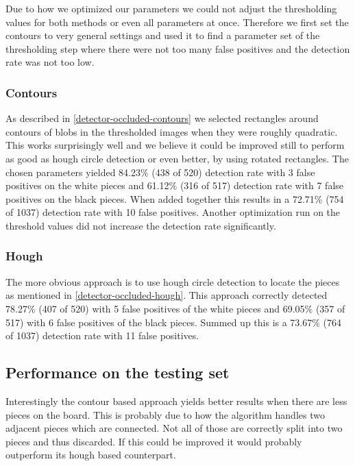 	Due to how we optimized our parameters we could not adjust the thresholding values for both methods or even all parameters at once. Therefore we first set the contours to very general settings and used it to find a parameter set of the thresholding step where there were not too many false positives and the detection rate was not too low.

	\subsubsection{Contours}
	\label{evaluation-occluded-optimization-contours}
	As described in \autoref{detector-occluded-contours} we selected rectangles around contours of blobs in the thresholded images when they were roughly quadratic. This works surprisingly well and we believe it could be improved still to perform as good as hough circle detection or even better, by using rotated rectangles. The chosen parameters yielded 84.23\% (438 of 520) detection rate with 3 false positives on the white pieces and 61.12\% (316 of 517) detection rate with 7 false positives on the black pieces. When added together this results in a 72.71\% (754 of 1037) detection rate with 10 false positives. Another optimization run on the threshold values did not increase the detection rate significantly.

	\subsubsection{Hough}
	\label{evaluation-occluded-optimization-hough}
	The more obvious approach is to use hough circle detection to locate the pieces as mentioned in \autoref{detector-occluded-hough}. This approach correctly detected 78.27\% (407 of 520) with 5 false positives of the white pieces and 69.05\% (357 of 517) with 6 false positives of the black pieces. Summed up this is a 73.67\% (764 of 1037) detection rate with 11 false positives.

	\subsection{Performance on the testing set}
	\label{evaluation-occluded-performance}
	
	Interestingly the contour based approach yields better results when there are less pieces on the board. This is probably due to how the algorithm handles two adjacent pieces which are connected. Not all of those are correctly split into two pieces and thus discarded. If this could be improved it would probably outperform its hough based counterpart.


